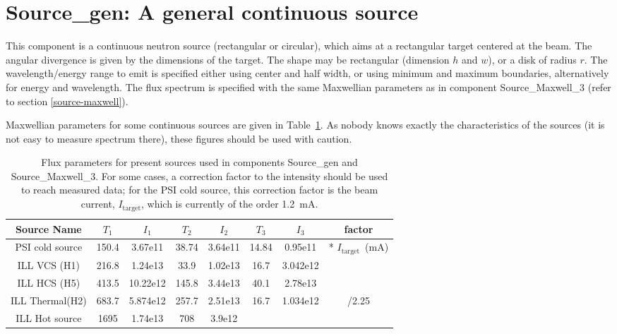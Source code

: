 \section{Source\_gen: A general continuous source}
\label{source-gen}


This component is a continuous neutron source (rectangular or circular), which aims at
a rectangular target centered at the beam.
The angular divergence is given by the dimensions of the target.
The shape may be rectangular (dimension $h$ and $w$), or a disk of radius $r$.
The wavelength/energy range to emit is specified either using center and half width, or using minimum and maximum boundaries, alternatively for energy and wavelength.
The flux spectrum is specified with the same Maxwellian parameters as in component Source\_Maxwell\_3 (refer to section \ref{source-maxwell}).

Maxwellian parameters for some continuous sources
are given in Table~\ref{t:source_gen-params}. As nobody knows exactly the characteristics of the sources (it is not easy to measure spectrum there), these figures should be used with caution.

\begin{table}
  \begin{center}
  {\let\my=\\
    \begin{tabular}{|c|cccccc|c|}
    \hline
    Source Name & $T_1$ & $I_1$ & $T_2$ & $I_2$ & $T_3$ & $I_3$ & factor \\
    \hline
    PSI cold source & 150.4  & 3.67e11   & 38.74 & 3.64e11    & 14.84& 0.95e11   & * $I_\textrm{target}$~(mA)\\
    ILL VCS (H1)    & 216.8  & 1.24e13   & 33.9  & 1.02e13    & 16.7 & 3.042e12  &\\
    ILL HCS (H5)    & 413.5  & 10.22e12  & 145.8 & 3.44e13    & 40.1 & 2.78e13   &\\
    ILL Thermal(H2) & 683.7  & 5.874e12  & 257.7 & 2.51e13    & 16.7 & 1.034e12  & /2.25\\
    ILL Hot source  & 1695   & 1.74e13   & 708   & 3.9e12     &      &           &\\ \hline
    \end{tabular}
    \caption{Flux parameters for present sources used in components
             Source\_gen and Source\_Maxwell\_3.
             For some cases, a correction factor to the intensity
             should be used to reach measured data; for the PSI cold source,
             this correction factor is the beam current, $I_\textrm{target}$,
             which is currently of the order 1.2~mA.
}
    \label{t:source_gen-params}
  }
  \end{center}
\end{table}
